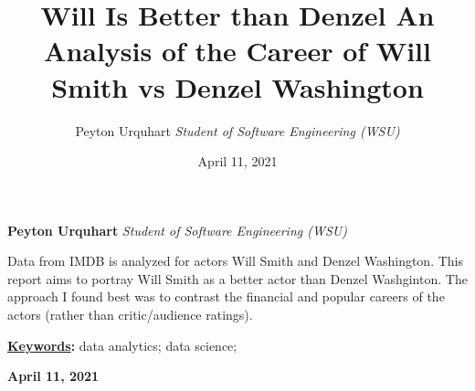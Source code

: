 \documentclass[]{article}
\title{\textbf{\textcolor{WSU.crimson}{Will Is Better than
Denzel}} \newline \textbf{\textcolor{WSU.gray}{An Analysis of the Career
of Will Smith vs Denzel Washington}}  }
\author{\Large Peyton
Urquhart\vspace{0.05in} \newline\normalsize\emph{Student of Software
Engineering (WSU)}  }
\date{April 11, 2021}
\newcommand*{\authorfont}{\fontfamily{phv}\selectfont}
\renewenvironment{abstract}
 {{%
    \setlength{\leftmargin}{0mm}
    \setlength{\rightmargin}{\leftmargin}%
  }%
  \relax}
 {\endlist}
\begin{document}
	
%    


{%
\setlength{\parindent}{0pt}
\thispagestyle{plain}
{\fontsize{18}{20}\selectfont\raggedright 
\maketitle  %

}

{
   \vskip 13.5pt\relax \normalsize\fontsize{11}{12} 
   
\textbf{\authorfont Peyton Urquhart} \hskip 15pt \emph{\small Student of
Software Engineering (WSU)}   

}

}








\begin{abstract}

    \hbox{\vrule height .2pt width 39.14pc}

    \vskip 8.5pt %

\noindent Data from IMDB is analyzed for actors Will Smith and Denzel
Washington. This report aims to portray Will Smith as a better actor
than Denzel Washginton. The approach I found best was to contrast the
financial and popular careers of the actors (rather than critic/audience
ratings).


\vskip 8.5pt \noindent \textbf{\underline{Keywords}:} data analytics;
data science; \par

    




    
    \hbox{\vrule height .2pt width 39.14pc}
    \vskip 5pt 
    \hfill \textbf{\textcolor{WSU.gray}{ April 11, 2021 } }
    \vskip 5pt 
    
\end{abstract}


\vskip -8.5pt




\noindent  
\end{document}

